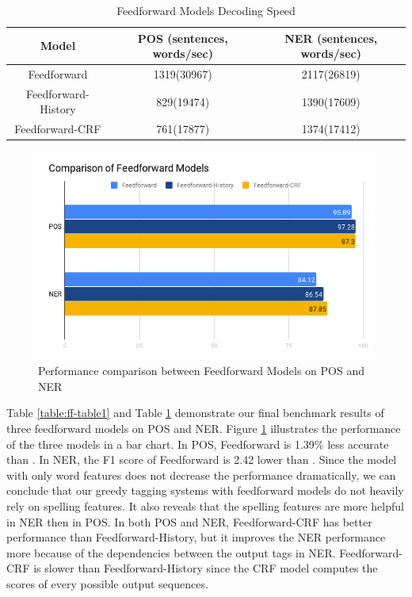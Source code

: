 \begin{table}[]
\centering
\caption{Feedforward Models Decoding Speed}
\label{table:ff-tabel2}
\begin{tabular}{|c|c|c|}
\hline
Model       & POS  (sentences, words/sec)  & NER  (sentences, words/sec)      \\ \hline
Feedforward    & 1319(30967)     & 2117(26819)    \\ \hline
Feedforward-History & 829(19474)     & 1390(17609)     \\ \hline
Feedforward-CRF    & 761(17877)     & 1374(17412)     \\ \hline
\end{tabular}
\end{table}

\begin{figure}
  \centering
  \includegraphics[scale=0.6]{ffbar.png}
 \caption{Performance comparison between Feedforward Models on POS and NER}
  \label{fig:ff}
\end{figure}


Table \ref{table:ff-table1} and Table \ref{table:ff-tabel2} demonstrate our final benchmark results of three feedforward models on POS and NER. Figure \ref{fig:ff} illustrates the performance of the three models in a bar chart. In POS, Feedforward is 1.39\% less accurate than \ffa. In NER, the F1 score of Feedforward is 2.42 lower than \ffa. Since the model with only word features does not decrease the performance dramatically, we can conclude that our greedy tagging systems with feedforward models do not heavily rely on spelling features. It also reveals that the spelling features are more helpful in NER then in POS. In both POS and NER, Feedforward-CRF has better performance than Feedforward-History, but it improves the NER performance more because of the dependencies between the output tags in NER. Feedforward-CRF is slower than Feedforward-History since the CRF model computes the scores of every possible output sequences.

